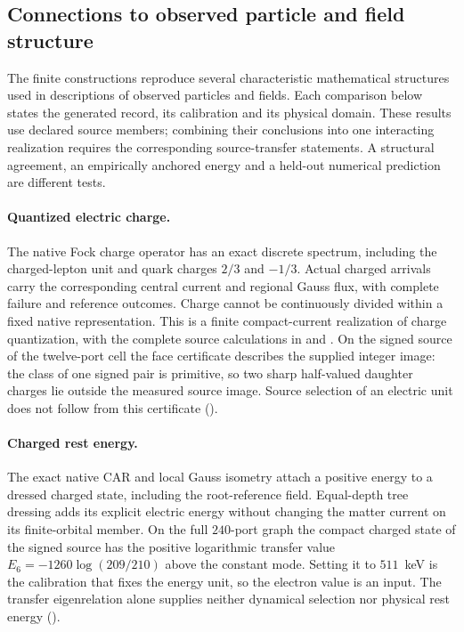 \subsection{Connections to observed particle and field structure}

The finite constructions reproduce several characteristic mathematical
structures used in descriptions of observed particles and fields. Each
comparison below states the generated record, its calibration and its
physical domain. These results use declared source members; combining
their conclusions into one interacting realization requires the
corresponding source-transfer statements. A structural agreement, an
empirically anchored energy and a held-out numerical prediction are
different tests.

\paragraph{Quantized electric charge.}
The native Fock charge operator has an exact discrete spectrum, including
the charged-lepton unit and quark charges $2/3$ and $-1/3$. Actual charged
arrivals carry the corresponding central current and regional Gauss
flux, with complete failure and reference outcomes. Charge cannot be
continuously divided within a fixed native representation. This is a
finite compact-current realization of charge quantization, with the
complete source calculations in 
and . On the signed source of the
twelve-port cell the face certificate describes the supplied integer image:
the class of one signed pair is primitive, so two sharp half-valued
daughter charges lie outside the measured source image. Source selection
of an electric unit does not follow from this certificate
().

\paragraph{Charged rest energy.}
The exact native CAR and local Gauss isometry attach a positive energy
to a dressed charged state, including the root-reference field.
Equal-depth tree dressing adds its explicit electric energy without
changing the matter current on its finite-orbital member. On the full
$240$-port graph the compact charged state of the signed source has the
positive logarithmic transfer value $E_6=-1260\log(209/210)$ above the constant mode.
Setting it to $511$~keV is the calibration that fixes the energy unit, so
the electron value is an input. The transfer eigenrelation alone supplies
neither dynamical selection nor physical rest energy
().

